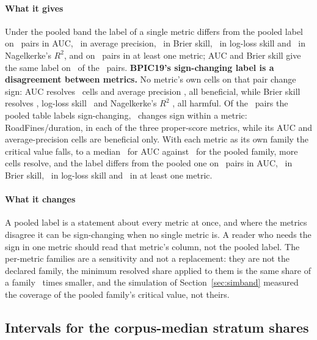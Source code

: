 \paragraph{What it gives}
Under the pooled band the label of a single metric differs from the pooled
label on \nPairsLabelDiffersAuc\ pairs in AUC, \nPairsLabelDiffersAp\ in
average precision, \nPairsLabelDiffersBrier\ in Brier skill,
\nPairsLabelDiffersLogloss\ in log-loss skill and
\nPairsLabelDiffersNagelkerke\ in Nagelkerke's $R^2$, and on
\nPairsLabelDiffersAny\ pairs in at least one metric; AUC and Brier skill give
the same label on \nPairsAucLabelEqualsBrier\ of the \nPairs\ pairs.
\textbf{BPIC19's sign-changing label is a disagreement between metrics.} No
metric's own cells on that pair change sign: AUC resolves
\nBpicNineteenBenAuc\ cells and average precision \nBpicNineteenBenAp, all
beneficial, while Brier skill resolves \nBpicNineteenHarmBrier, log-loss skill
\nBpicNineteenHarmLogloss\ and Nagelkerke's $R^2$
\nBpicNineteenHarmNagelkerke, all harmful. Of the \nSignChanging\ pairs the
pooled table labels sign-changing, \nSignChangingWithinMetric\ changes sign
within a metric: RoadFines/duration, in each of the three proper-score
metrics, while its AUC and average-precision cells are beneficial only. With
each metric as its own family the critical value falls, to a median
\qEmpWithinAucMedian\ for AUC against \qEmpWholeMedian\ for the pooled family,
more cells resolve, and the label differs from the pooled one on
\nPairsLabelDiffersWithinAuc\ pairs in AUC, \nPairsLabelDiffersWithinBrier\ in
Brier skill, \nPairsLabelDiffersWithinLogloss\ in log-loss skill and
\nPairsLabelDiffersWithinAny\ in at least one metric.

\paragraph{What it changes}
A pooled label is a statement about every metric at once, and where the
metrics disagree it can be sign-changing when no single metric is. A reader
who needs the sign in one metric should read that metric's column, not the
pooled label. The per-metric families are a sensitivity and not a
replacement: they are not the declared family, the minimum resolved share
applied to them is the same share of a family \nInstruments\ times smaller,
and the simulation of Section~\ref{sec:simband} measured the coverage of the
pooled family's critical value, not theirs.

\subsection{Intervals for the corpus-median stratum shares}
\label{app:ijf-intervals}

